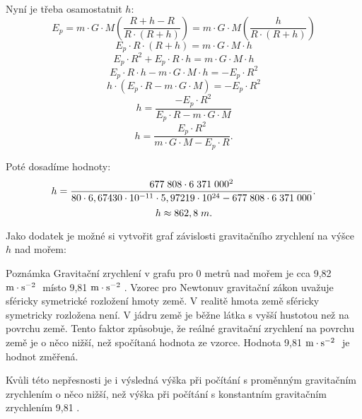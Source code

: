 \documentclass{article}
\begin{document}
Nyní je třeba osamostatnit $h$:
$$
    E_p = m \cdot G \cdot M \left( \frac{R + h - R}{R \cdot (R + h)} \right) = m \cdot G \cdot M \left( \frac{h}{R \cdot (R + h)} \right)
$$
$$
    E_p \cdot R \cdot (R + h) = m \cdot G \cdot M \cdot h
$$
$$
    E_p \cdot R^2 + E_p \cdot R \cdot h = m \cdot G \cdot M \cdot h
$$
$$
    E_p \cdot R \cdot h - m \cdot G \cdot M \cdot h = - E_p \cdot R^2
$$
$$
    h \cdot (E_p \cdot R - m \cdot G \cdot M) = - E_p \cdot R^2
$$
$$
    h = \frac{- E_p \cdot R^2}{E_p \cdot R - m \cdot G \cdot M}
$$
$$
    h = \frac{E_p \cdot R^2}{m \cdot G \cdot M - E_p \cdot R}.
$$

Poté dosadíme hodnoty:
$$
    h = \frac{677 \; 808 \cdot 6 \; 371 \; 000^2}{80 \cdot 6,67430 \cdot 10^{-11} \cdot 5,97219 \cdot 10^{24} - 677 \; 808 \cdot 6 \; 371 \; 000}.
$$
$$
    h \approx 862,8 \; m.
$$

Jako dodatek je možné si vytvořit graf závislosti gravitačního zrychlení na výšce $h$ nad mořem:

\begin{center}
\end{center}

\begin{notebox}{Poznámka}
    Gravitační zrychlení v grafu pro 0 metrů nad mořem je cca 9,82 $\textrm{m} \cdot \textrm{s}^{-2} \;$ místo 9,81 $\textrm{m} \cdot \textrm{s}^{-2} \;$. Vzorec pro Newtonuv gravitační zákon uvažuje sféricky symetrické rozložení hmoty země. V realitě hmota země sféricky symetricky rozložena není. V jádru země je běžne látka s vyšší hustotou než na povrchu země. Tento faktor způsobuje, že reálné gravitační zrychlení na povrchu země je o něco nižší, než spočítaná hodnota ze vzorce. Hodnota 9,81 $\textrm{m} \cdot \textrm{s}^{-2} \;$ je hodnot změřená.

    Kvůli této nepřesnosti je i výsledná výška při počítání s proměnným gravitačním zrychlením o něco nižší, než výška při počítání s konstantním gravitačním zrychlením 9,81 \ueqMandSinvsq.
\end{notebox}
\end{document}
